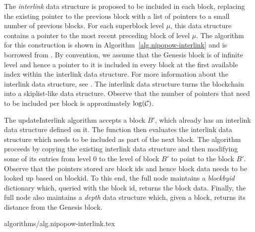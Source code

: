 The \textit{interlink} data structure is proposed to be included in each block,
replacing the existing pointer to the previous block with a list of pointers to
a small number of previous blocks. For each superblock level $\mu$, this data
structure contains a pointer to the most recent preceding block of level
$\mu$. The algorithm for this construction is shown in
Algorithm~\ref{alg.nipopow-interlink} and is borrowed from \cite{KLS}. By
convention, we assume that the Genesis block is of infinite level and hence a
pointer to it is included in every block at the first available index within
the interlink data structure. For more information about the interlink data
structure, see \cite{KLS}. The interlink data structure turns the blockchain
into a skiplist-like data structure. Observe that the number of pointers that
need to be included per block is approximately $\log(\mathcal{C})$.

The updateInterlink algorithm accepts a block $B'$, which already has an
interlink data structure defined on it. The function then evaluates the
interlink data structure which needs to be included as part of the next block.
The algorithm proceeds by copying the existing interlink data structure and
then modifying some of its entries from level $0$ to the level of block $B'$ to
point to the block $B'$. Observe that the pointers stored are block ids and
hence block data needs to be looked up based on blockid. To this end, the full
node maintains a \textit{blockbyid} dictionary which, queried with the block
id, returns the block data. Finally, the full node also maintains a
\textit{depth} data structure which, given a block, returns its distance from
the Genesis block.

{algorithms/alg.nipopow-interlink.tex}
